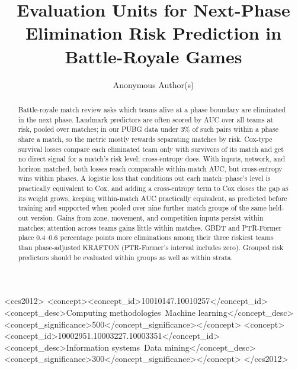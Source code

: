 \documentclass[sigconf,anonymous]{acmart}
\begin{document}
\title{Evaluation Units for Next-Phase Elimination Risk Prediction in Battle-Royale Games}
\renewcommand{\shorttitle}{Evaluation Units for Next-Phase Elimination Prediction}

\author{Anonymous Author(s)}

\begin{abstract}
Battle-royale match review asks which teams alive at a phase boundary are eliminated in the next phase. Landmark predictors are often scored by AUC over all teams at risk, pooled over matches; in our PUBG data under 3\% of such pairs within a phase share a match, so the metric mostly rewards separating matches by risk. Cox-type survival losses compare each eliminated team only with survivors of its match and get no direct signal for a match's risk level; cross-entropy does. With inputs, network, and horizon matched, both losses reach comparable within-match AUC, but cross-entropy wins within phases. A logistic loss that conditions out each match--phase's level is practically equivalent to Cox, and adding a cross-entropy term to Cox closes the gap as its weight grows, keeping within-match AUC practically equivalent, as predicted before training and supported when pooled over nine further match groups of the same held-out version. Gains from zone, movement, and competition inputs persist within matches; attention across teams gains little within matches. GBDT and PTR-Former place 0.4--0.6 percentage points more eliminations among their three riskiest teams than phase-adjusted KRAFTON (PTR-Former's interval includes zero). Grouped risk predictors should be evaluated within groups as well as within strata.
\end{abstract}
\begin{CCSXML}
<ccs2012>
<concept><concept_id>10010147.10010257</concept_id><concept_desc>Computing methodologies~Machine learning</concept_desc><concept_significance>500</concept_significance></concept>
<concept><concept_id>10002951.10003227.10003351</concept_id><concept_desc>Information systems~Data mining</concept_desc><concept_significance>300</concept_significance></concept>
</ccs2012>
\end{CCSXML}
\maketitle
\end{document}
